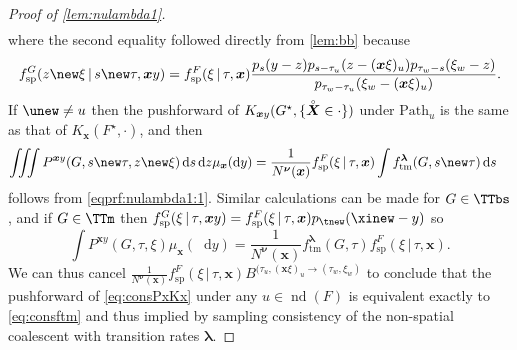 \documentclass[reqno,draft]{amsart}
\numberwithin{equation}{section}
\theoremstyle{plain}
\theoremstyle{remark}
\newcommand*\diff{\mathop{}\!\mathrm{d}}
\DeclareMathOperator{\nd}{nd}
\newcommand{\pth}{\mathrm{Path}}
\newcommand{\ftm}{f_\mathrm{tm}^{\boldsymbol \lambda}}
\newcommand{\fsp}{f_\mathrm{sp}}
\newcommand{\rs}[1]{\accentset{\circ}{#1}} %
\begin{document}
\begin{proof}[Proof of \cref{lem:nulambda1}]
\begin{align}
    \end{align}
    where the second equality followed directly from \cref{lem:bb} because
    \begin{equation}\label{eqprf:nulambda1:3}
        \fsp^G(z\new\xi \,\vert\,s\new\tau,\boldsymbol xy) = \fsp^F(\xi \,\vert\,\tau,\boldsymbol x) \frac{p_s(y-z) p_{s-\tau_{u}}(z-(\boldsymbol x\xi)_{u}) p_{\tau_{w}-s}(\xi_{w}-z)}{p_{\tau_{w}-\tau_{u}}(\xi_{w}-(\boldsymbol x\xi)_{u})}.
    \end{equation}
    If $\unew \neq u$ then the pushforward of $K_{\boldsymbol xy}(G^\star,\{\rs{\boldsymbol X}\in \cdot \})$ under $\pth_u$ is the same as that of $K_{\boldsymbol x}(F^\star,\cdot )$, and then
    \begin{align*}
        \iiint P^{\boldsymbol xy}(G,s\new\tau,z\new\xi)\diff s\diff z\mu_{\boldsymbol x}(\diff y)
        &= \frac{1}{N^{\boldsymbol\nu}(\boldsymbol x)} \fsp^F(\xi \,\vert\,\tau,\boldsymbol x) \int \ftm(G,s\new\tau) \diff s
    \end{align*}
    follows from \cref{eqprf:nulambda1:1}. Similar calculations can be made for $G\in \TTbs$, and if $G\in \TTm$ then $\fsp^G(\xi \,\vert\,\tau,\boldsymbol xy) = \fsp^F(\xi \,\vert\,\tau,\boldsymbol x) p_{\tnew}(\xinew-y)$ so \[
        \int P^{\boldsymbol xy}(G,\tau,\xi) \mu_{\boldsymbol x}(\diff y) = \frac{1}{N^{\boldsymbol\nu}(\boldsymbol x)} \ftm(G,\tau) \fsp^F(\xi \,\vert\,\tau,\boldsymbol x).
    \] We can thus cancel $\frac{1}{N^{\boldsymbol\nu}(\boldsymbol x)} \fsp^F(\xi \,\vert\,\tau,\boldsymbol x) B^{(\tau_u,(\boldsymbol x\xi)_u \to (\tau_w,\xi_w)}$ to conclude that the pushforward of \cref{eq:consPxKx} under any $u\in \nd(F)$ is equivalent exactly to \cref{eq:consftm} and thus implied by sampling consistency of the non-spatial coalescent with transition rates $\boldsymbol \lambda$.
\end{proof}
\end{document}
